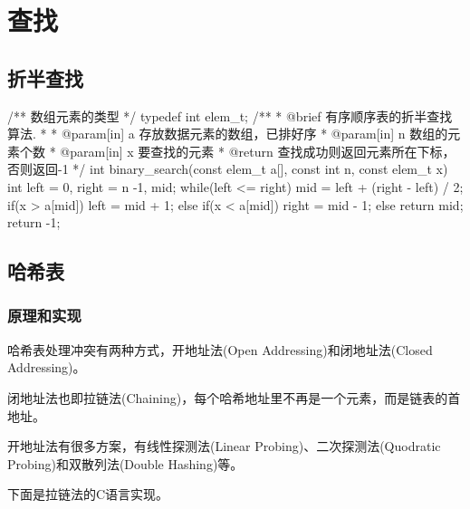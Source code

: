 \chapter{查找}

\section{折半查找} %

\begin{Codex}[label=binary_search.c]
/** 数组元素的类型 */
typedef int elem_t;
/**
  * @brief 有序顺序表的折半查找算法.
  *
  * @param[in] a 存放数据元素的数组，已排好序
  * @param[in] n 数组的元素个数
  * @param[in] x 要查找的元素
  * @return 查找成功则返回元素所在下标，否则返回-1
  */
int binary_search(const elem_t a[], const int n, const elem_t x) {
    int left = 0, right = n -1, mid;
    while(left <= right) {
        mid = left + (right - left) / 2;
        if(x > a[mid]) {
            left = mid + 1;
        } else if(x < a[mid]) {
            right = mid - 1;
        } else {
            return mid;
        }
    }
    return -1;
}
\end{Codex}


\section{哈希表} %


\subsection{原理和实现}
\label{sec:hash-set}
哈希表处理冲突有两种方式，开地址法(Open Addressing)和闭地址法(Closed Addressing)。

闭地址法也即拉链法(Chaining)，每个哈希地址里不再是一个元素，而是链表的首地址。

开地址法有很多方案，有线性探测法(Linear Probing)、二次探测法(Quodratic Probing)和双散列法(Double Hashing)等。

下面是拉链法的C语言实现。

